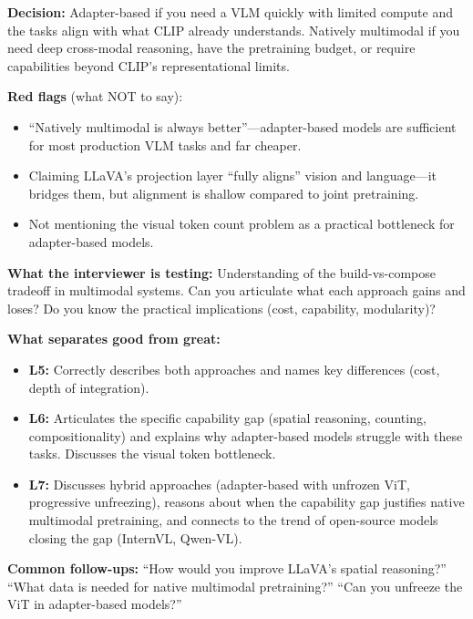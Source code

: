 \begin{interviewq}
\textbf{Decision:} Adapter-based if you need a VLM quickly with limited compute and the tasks align with what CLIP already understands. Natively multimodal if you need deep cross-modal reasoning, have the pretraining budget, or require capabilities beyond CLIP's representational limits.

\textbf{Red flags} (what NOT to say):
\begin{itemize}
    \item ``Natively multimodal is always better''---adapter-based models are sufficient for most production VLM tasks and far cheaper.
    \item Claiming LLaVA's projection layer ``fully aligns'' vision and language---it bridges them, but alignment is shallow compared to joint pretraining.
    \item Not mentioning the visual token count problem as a practical bottleneck for adapter-based models.
\end{itemize}

\textbf{What the interviewer is testing:} Understanding of the build-vs-compose tradeoff in multimodal systems. Can you articulate what each approach gains and loses? Do you know the practical implications (cost, capability, modularity)?

\textbf{What separates good from great:}
\begin{itemize}
    \item \textbf{L5:} Correctly describes both approaches and names key differences (cost, depth of integration).
    \item \textbf{L6:} Articulates the specific capability gap (spatial reasoning, counting, compositionality) and explains why adapter-based models struggle with these tasks. Discusses the visual token bottleneck.
    \item \textbf{L7:} Discusses hybrid approaches (adapter-based with unfrozen ViT, progressive unfreezing), reasons about when the capability gap justifies native multimodal pretraining, and connects to the trend of open-source models closing the gap (InternVL, Qwen-VL).
\end{itemize}

\textbf{Common follow-ups:} ``How would you improve LLaVA's spatial reasoning?'' ``What data is needed for native multimodal pretraining?'' ``Can you unfreeze the ViT in adapter-based models?''
\end{interviewq}


